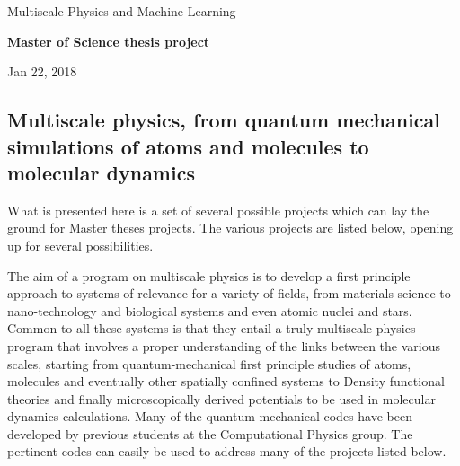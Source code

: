 \documentclass[%
oneside,                 %
final,                   %
10pt]{article}
\begin{document}

\newcommand{\exercisesection}[1]{\subsection*{#1}}






\thispagestyle{empty}

\begin{center}
{\LARGE\bf
\begin{spacing}{1.25}
Multiscale Physics and Machine Learning
\end{spacing}
}
\end{center}


\begin{center}
{\bf Master of Science thesis project${}^{}$} \\ [0mm]
\end{center}

\begin{center}
\end{center}
    

\begin{center}
Jan 22, 2018
\end{center}

\vspace{1cm}


\subsection*{Multiscale physics, from quantum mechanical simulations of atoms and molecules to molecular dynamics}

What is presented here is a set of several possible  projects which can lay the ground for 
Master theses projects.  The various projects are listed below,
opening up for several possibilities.

The aim of a program on multiscale physics is to develop a first
principle approach to systems of relevance for a variety of fields,
from materials science to nano-technology and biological systems and
even atomic nuclei and stars.  Common to all these systems is that
they entail a truly multiscale physics program that involves a proper
understanding of the links between the various scales, starting from
quantum-mechanical first principle studies of atoms, molecules and
eventually other spatially confined systems to Density functional
theories and finally microscopically derived potentials to be used in
molecular dynamics calculations. Many of the quantum-mechanical codes have been developed by previous 
students at the Computational Physics group. The pertinent codes can easily be used to address many of the projects listed below.
\end{document}
